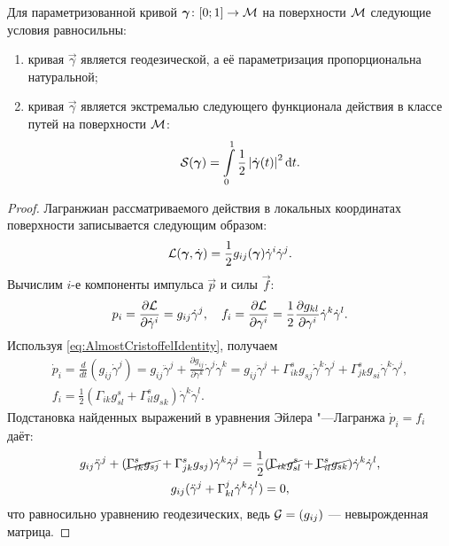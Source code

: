 \begin{theorem} \label{theorem:GeodesicExtremal}
	Для параметризованной кривой $\boldsymbol{\gamma}\colon [0; 1] \to \mathcal{M}$ на поверхности $\mathcal{M}$ следующие условия равносильны:
	\begin{enumerate}[nolistsep, label=(\arabic*)]
		\item кривая $\vec{\gamma}$ является геодезической, а её параметризация пропорциональна натуральной;
		\item кривая $\vec{\gamma}$ является экстремалью следующего функционала действия в классе путей на поверхности $\mathcal{M}$:
			\[
				\mathcal{S}(\boldsymbol{\gamma}) = \int\limits_0^1\frac{1}{2}\left\lvert\dot{\boldsymbol{\gamma}}(t)\right\rvert^2\mathop{}\!\mathrm{d} t.
			\]
	\end{enumerate}
\end{theorem}

\begin{proof}
	Лагранжиан рассматриваемого действия в локальных координатах поверхности записывается следующим образом:
	\[
		\mathcal{L}(\boldsymbol{\gamma}, \dot{\boldsymbol{\gamma}}) = \frac{1}{2}g_{ij}(\boldsymbol{\gamma})\dot{\gamma}^i\dot{\gamma}^j.
	\]
	Вычислим $i$-е компоненты импульса $\vec{p}$ и силы $\vec{f}$:
	\[
		p_i = \frac{\partial\mathcal{L}}{\partial\dot{\gamma}^i} = g_{ij}\dot{\gamma}^j,\quad f_i = \frac{\partial\mathcal{L}}{\partial\gamma^i} = \frac{1}{2}\frac{\partial g_{kl}}{\partial\gamma^i}\dot{\gamma}^k\dot{\gamma}^l.
	\]
	Используя \eqref{eq:AlmostCristoffelIdentity}, получаем
	\begin{gather*}
		\dot{p}_i = \frac{d}{dt}(g_{ij}\dot{\gamma}^j) = g_{ij}\ddot{\gamma}^j + \frac{\partial g_{ij}}{\partial\gamma^k}\dot{\gamma}^j\dot{\gamma}^k = g_{ij}\ddot{\gamma}^j + \Gamma_{ik}^sg_{sj}\dot{\gamma}^k\dot{\gamma}^j + \Gamma_{jk}^sg_{si}\dot{\gamma}^k\dot{\gamma}^j,\\
		f_i = \frac{1}{2}(\Gamma_{ik}g_{sl}^s + \Gamma_{il}^sg_{sk})\dot{\gamma}^k\dot{\gamma}^l.
	\end{gather*}
	Подстановка найденных выражений в уравнения Эйлера "---Лагранжа $\dot{p}_i = f_i$ даёт:
	\begin{gather*}
		g_{ij}\ddot{\gamma}^j + (\cancel{\Gamma_{ik}^sg_{sj}} + \Gamma_{jk}^sg_{sj})\dot{\gamma}^k\dot{\gamma}^j = \frac{1}{2}(\cancel{\Gamma_{ik}g_{sl}^s} + \cancel{\Gamma_{il}^sg_{sk}})\dot{\gamma}^k\dot{\gamma}^l,\\
		g_{ij}(\ddot{\gamma}^j + \Gamma_{kl}^j\dot{\gamma}^k\dot{\gamma}^l) = 0,
	\end{gather*}
	что равносильно уравнению геодезических, ведь $\mathcal{G} = (g_{ij})$ --- невырожденная матрица.
\end{proof}

